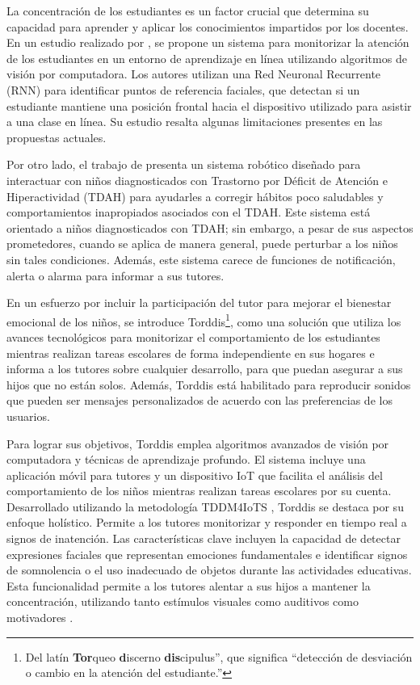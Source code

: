 \documentclass[a4paper,fleqn]{cas-sc}
\begin{document}
		La concentración de los estudiantes es un factor crucial que determina su capacidad para aprender y aplicar los conocimientos impartidos por los docentes. En un estudio realizado por \cite{Terraza2022}, se propone un sistema para monitorizar la atención de los estudiantes en un entorno de aprendizaje en línea utilizando algoritmos de visión por computadora. Los autores utilizan una Red Neuronal Recurrente (RNN) para identificar puntos de referencia faciales, que detectan si un estudiante mantiene una posición frontal hacia el dispositivo utilizado para asistir a una clase en línea. Su estudio resalta algunas limitaciones presentes en las propuestas actuales.
		
		Por otro lado, el trabajo de \cite{Berrezueta-Guzman2021} presenta un sistema robótico diseñado para interactuar con niños diagnosticados con Trastorno por Déficit de Atención e Hiperactividad (TDAH) para ayudarles a corregir hábitos poco saludables y comportamientos inapropiados asociados con el TDAH. Este sistema está orientado a niños diagnosticados con TDAH; sin embargo, a pesar de sus aspectos prometedores, cuando se aplica de manera general, puede perturbar a los niños sin tales condiciones. Además, este sistema carece de funciones de notificación, alerta o alarma para informar a sus tutores.
		
		En un esfuerzo por incluir la participación del tutor para mejorar el bienestar emocional de los niños, se introduce Torddis\footnote{Del latín \textbf{Tor}queo \textbf{d}iscerno \textbf{dis}cipulus'', que significa ``detección de desviación o cambio en la atención del estudiante.''}, como una solución que utiliza los avances tecnológicos para monitorizar el comportamiento de los estudiantes mientras realizan tareas escolares de forma independiente en sus hogares e informa a los tutores sobre cualquier desarrollo, para que puedan asegurar a sus hijos que no están solos. Además, Torddis está habilitado para reproducir sonidos que pueden ser mensajes personalizados de acuerdo con las preferencias de los usuarios.
		
		Para lograr sus objetivos, Torddis emplea algoritmos avanzados de visión por computadora y técnicas de aprendizaje profundo. El sistema incluye una aplicación móvil para tutores y un dispositivo IoT que facilita el análisis del comportamiento de los niños mientras realizan tareas escolares por su cuenta. Desarrollado utilizando la metodología TDDM4IoTS \citep{Guerrero-Ulloa2020TDDM4IoTS}, Torddis se destaca por su enfoque holístico. Permite a los tutores monitorizar y responder en tiempo real a signos de inatención. Las características clave incluyen la capacidad de detectar expresiones faciales que representan emociones fundamentales e identificar signos de somnolencia o el uso inadecuado de objetos durante las actividades educativas. Esta funcionalidad permite a los tutores alentar a sus hijos a mantener la concentración, utilizando tanto estímulos visuales como auditivos como motivadores \citep{Al-Gburi2023,Enadula2021,Terraza2022}.
		
\end{document}
